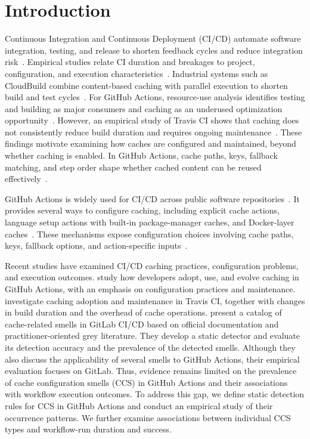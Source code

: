 \documentclass[smallextended]{svjour3}
\begin{document}
\section{Introduction}
\label{sec:intro}

Continuous Integration and Continuous Deployment (CI/CD) automate software integration, testing, and release to shorten feedback cycles and reduce integration risk~\citep{duvall2007continuous,shahin2017continuous}. Empirical studies relate CI duration and breakages to project, configuration, and execution characteristics~\citep{ghaleb2019empirical,ghaleb2022studying}. Industrial systems such as CloudBuild combine content-based caching with parallel execution to shorten build and test cycles~\citep{esfahani2016cloudbuild}. For GitHub Actions, resource-use analysis identifies testing and building as major consumers and caching as an underused optimization opportunity~\citep{bouzenia2024resource}. However, an empirical study of Travis CI shows that caching does not consistently reduce build duration and requires ongoing maintenance~\citep{ghaleb2026cachingreality}. These findings motivate examining how caches are configured and maintained, beyond whether caching is enabled. In GitHub Actions, cache paths, keys, fallback matching, and step order shape whether cached content can be reused effectively~\citep{hasan2026caching,gha_cache_docs}.

GitHub Actions is widely used for CI/CD across public software repositories~\citep{decan2022use}. It provides several ways to configure caching, including explicit cache actions, language setup actions with built-in package-manager caches, and Docker-layer caches~\citep{hasan2026caching,gha_cache_docs}. These mechanisms expose configuration choices involving cache paths, keys, fallback options, and action-specific inputs~\citep{hasan2026caching,gha_cache_docs}.

Recent studies have examined CI/CD caching practices, configuration problems, and execution outcomes. \citet{hasan2026caching} study how developers adopt, use, and evolve caching in GitHub Actions, with an emphasis on configuration practices and maintenance. \citet{ghaleb2026cachingreality} investigate caching adoption and maintenance in Travis CI, together with changes in build duration and the overhead of cache operations. \citet{urdih2026cache} present a catalog of cache-related smells in GitLab CI/CD based on official documentation and practitioner-oriented grey literature. They develop a static detector and evaluate its detection accuracy and the prevalence of the detected smells. Although they also discuss the applicability of several smells to GitHub Actions, their empirical evaluation focuses on GitLab. Thus, evidence remains limited on the prevalence of cache configuration smells (CCS) in GitHub Actions and their associations with workflow execution outcomes. To address this gap, we define static detection rules for CCS in GitHub Actions and conduct an empirical study of their occurrence patterns. We further examine associations between individual CCS types and workflow-run duration and success.
\end{document}
